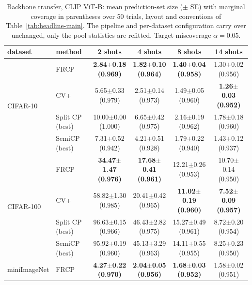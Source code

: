 \begin{table}[t]
\centering
\small
\caption{Backbone transfer, CLIP ViT-B: mean prediction-set size ($\pm$ SE) with marginal coverage in parentheses over 50 trials, layout and conventions of Table~\ref{tab:headline-main}. The pipeline and per-dataset configuration carry over unchanged, only the pool statistics are refitted. Target miscoverage $\alpha=0.05$.}
\label{tab:backbone-clipb-a005}
\begin{tabular}{llcccc}
\toprule
dataset & method & 2 shots & 4 shots & 8 shots & 14 shots\\
\midrule
\multirow{4}{*}{CIFAR-10} & FRCP & \textbf{2.84$\pm$0.18 {\scriptsize(0.969)}} & \textbf{1.82$\pm$0.10 {\scriptsize(0.964)}} & \textbf{1.40$\pm$0.04 {\scriptsize(0.958)}} & 1.30$\pm$0.02 {\scriptsize(0.956)}\\
 & CV+ & 5.65$\pm$0.33 {\scriptsize(0.979)} & 2.51$\pm$0.14 {\scriptsize(0.973)} & 1.49$\pm$0.05 {\scriptsize(0.960)} & \textbf{1.26$\pm$0.03 {\scriptsize(0.952)}}\\
 & Split CP (best) & 10.00$\pm$0.00 {\scriptsize(1.000)} & 6.65$\pm$0.42 {\scriptsize(0.975)} & 2.16$\pm$0.19 {\scriptsize(0.962)} & 1.78$\pm$0.18 {\scriptsize(0.960)}\\
 & SemiCP (best) & 7.31$\pm$0.52 {\scriptsize(0.942)} & 4.21$\pm$0.51 {\scriptsize(0.928)} & 1.79$\pm$0.22 {\scriptsize(0.940)} & 1.43$\pm$0.12 {\scriptsize(0.937)}\\
\midrule
\multirow{4}{*}{CIFAR-100} & FRCP & \textbf{34.47$\pm$1.47 {\scriptsize(0.976)}} & \textbf{17.68$\pm$0.41 {\scriptsize(0.961)}} & 12.21$\pm$0.26 {\scriptsize(0.953)} & 10.70$\pm$0.14 {\scriptsize(0.950)}\\
 & CV+ & 58.82$\pm$1.30 {\scriptsize(0.985)} & 20.41$\pm$0.42 {\scriptsize(0.965)} & \textbf{11.02$\pm$0.19 {\scriptsize(0.960)}} & \textbf{7.52$\pm$0.09 {\scriptsize(0.957)}}\\
 & Split CP (best) & 96.63$\pm$0.15 {\scriptsize(0.966)} & 46.43$\pm$2.82 {\scriptsize(0.975)} & 15.27$\pm$0.49 {\scriptsize(0.961)} & 8.72$\pm$0.20 {\scriptsize(0.954)}\\
 & SemiCP (best) & 95.92$\pm$0.19 {\scriptsize(0.960)} & 45.13$\pm$3.29 {\scriptsize(0.963)} & 14.11$\pm$0.55 {\scriptsize(0.955)} & 8.25$\pm$0.23 {\scriptsize(0.950)}\\
\midrule
\multirow{4}{*}{miniImageNet} & FRCP & \textbf{4.27$\pm$0.22 {\scriptsize(0.970)}} & \textbf{2.04$\pm$0.05 {\scriptsize(0.956)}} & \textbf{1.68$\pm$0.03 {\scriptsize(0.952)}} & 1.58$\pm$0.02 {\scriptsize(0.951)}\\

\end{tabular}
\end{table}
